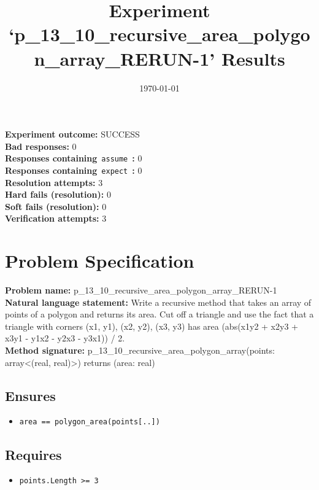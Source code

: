 \documentclass{article}
\begin{document}
\title{Experiment `p\_13\_10\_recursive\_area\_polygon\_array\_RERUN-1' Results}
\author{\today}
\date{}
\maketitle
\textbf{Experiment outcome: }SUCCESS
\\\textbf{Bad responses: }0
\\\textbf{Responses containing}~\texttt{assume}~\textbf{: }0
\\\textbf{Responses containing}~\texttt{expect}~\textbf{: }0
\\\textbf{Resolution attempts: }3
\\\textbf{Hard fails (resolution): }0
\\\textbf{Soft fails (resolution): }0
\\\textbf{Verification attempts: }3
\section*{Problem Specification}
\textbf{Problem name: }p\_13\_10\_recursive\_area\_polygon\_array\_RERUN-1
\\\textbf{Natural language statement: }Write a recursive method that takes an array of points of a polygon and returns its area. Cut off a triangle and use the fact that a triangle with corners (x1, y1), (x2, y2), (x3, y3) has area (abs(x1y2 + x2y3 + x3y1 - y1x2 - y2x3 - y3x1)) / 2.
\\\textbf{Method signature: }p\_13\_10\_recursive\_area\_polygon\_array(points: array<(real, real)>) returns (area: real)
\subsection*{Ensures}
\begin{itemize}
\item \texttt{area == polygon\_area(points[..])}
\end{itemize}
\subsection*{Requires}
\begin{itemize}
\item \texttt{points.Length >= 3}
\end{itemize}
\end{document}
